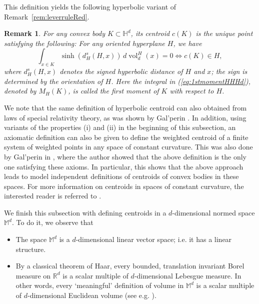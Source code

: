 \documentclass[twoside]{amsart}
\theoremstyle{plain}
\newtheorem{remark}[theorem]{Remark}
\theoremstyle{definition}
\numberwithin{equation}{section}
\renewcommand{\Re}{\mathbb R}
\newcommand{\HHH}{\mathbb{H}}
\newcommand{\MM}{\mathbb{M}}
\DeclareMathOperator{\vol}{vol}
\begin{document}
This definition yields the following hyperbolic variant of Remark~\ref{rem:leverruleRed}.

\begin{remark}\label{rem:leverruleHHHd}
For any convex body $K \subset \HHH^d$, its centroid $c(K)$ is the unique point satisfying the following:
For any oriented hyperplane $H$, we have
\begin{equation}\label{eq:1stmomentHHHd}
\int_{x \in K} \sinh (d_H^s(H,x)) \, d \vol_d^H(x) = 0 \Longleftrightarrow c(K) \in H,
\end{equation}
where $d_H^s(H,x)$ denotes the signed hyperbolic distance of $H$ and $x$; the sign is determined by the orientation of $H$. Here the integral in (\ref{eq:1stmomentHHHd}), denoted by $M_H(K)$, is called the \emph{first moment} of $K$ with respect to $H$.
\end{remark}

We note that the same definition of hyperbolic centroid can also obtained from laws of special relativity theory, as was shown by Gal'perin \cite{Galperin}. In addition, using variants of the properties (i) and (ii) in the beginning of this subsection, an axiomatic definition can also be given to define the weighted centroid of a finite system of weighted points in any space of constant curvature. This was also done by Gal'perin in \cite{Galperin}, where the author showed that the above definition is the only one satisfying these axioms. In particular, this shows that the above approach leads to model independent definitions of centroids of convex bodies in these spaces. For more information on centroids in spaces of constant curvature, the interested reader is referred to \cite{Galperin}.

We finish this subsection with defining centroids in a $d$-dimensional normed space $\MM^d$. To do it, we observe that
\begin{itemize}
\item[(i)] The space $\MM^d$ is a $d$-dimensional linear vector space; i.e. it has a linear structure.
\item[(ii)] By a classical theorem of Haar, every bounded, translation invariant Borel measure on $\Re^d$ is a scalar multiple of $d$-dimensional Lebesgue measure. In other words, every `meaningful' definition of volume in $\MM^d$ is a scalar multiple of $d$-dimensional Euclidean volume (see e.g. \cite{AT, BL, Langi16}).
\end{itemize}
\end{document}
